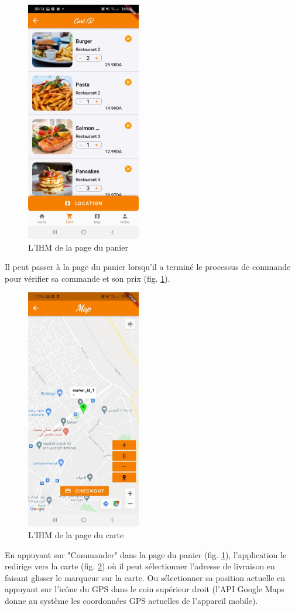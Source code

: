 \documentclass[french, a4paper, 12pt]{report}
\begin{document}
		\newpage
		\begin{figure}[h!]
			\center
			\includegraphics[width=5cm]{screenshots/ClientViews/theCART.jpg}
			\caption{L'IHM de la page du panier}
			\label{fig:clicrt}
		\end{figure} Il peut passer à la page du panier lorsqu'il a terminé le processus de commande pour vérifier sa commande et son prix (fig. \ref{fig:clicrt}).

\newpage

		\begin{figure}[h!]
			\center
			\includegraphics[width=5cm]{screenshots/ClientViews/Deliverymap(fonctional).jpg}
			\caption{L'IHM de la page du carte}
			\label{fig:climap}
		\end{figure} En appuyant sur "Commander" dans la page du panier (fig. \ref{fig:clicrt}), l'application le redirige vers la carte (fig. \ref{fig:climap}) où il peut sélectionner l'adresse de livraison en faisant glisser le marqueur sur la carte. Ou sélectionner sa position actuelle en appuyant sur l'icône du GPS dans le coin supérieur droit (l'API Google Maps donne au système les coordonnées GPS actuelles de l'appareil mobile).
\end{document}
